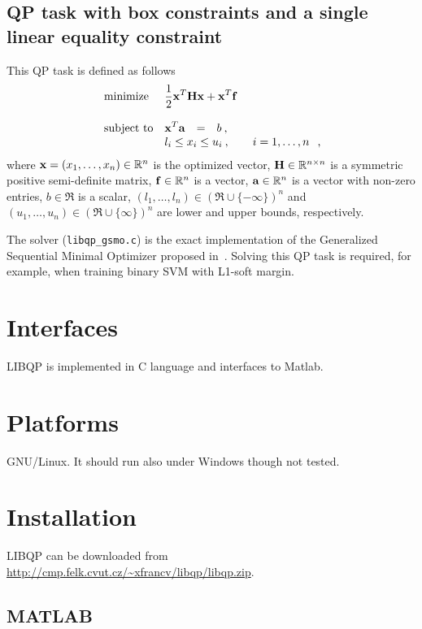 \documentclass{amsart}
\begin{document}
\subsection*{QP task with box constraints and a single linear equality constraint}
This QP task is defined as follows
\[
  \begin{array}{lrcl}
    \mbox{minimize} &\multicolumn{3}{l}{\displaystyle\frac{1}{2}\x^T \H \x +
      \x^T \f} \\ \\
    \mbox{subject to} 
    & \displaystyle\x^T \a & = & b\:, \\ 
    & \multicolumn{3}{c}{\displaystyle l_i \leq x_i \leq u_i\:, \qquad i=1,\ldots,n}\:,
  \end{array}
\]
where \(\mathbf x = (x_1,\ldots,x_n)\in\mathbb{R}^n\) is the optimized vector, \(\mathbf H
\in\mathbb{R}^{n\times n}\) is a symmetric positive semi-definite matrix,
\(\mathbf f\in\mathbb{R}^n\) is a vector, $\mathbf a\in\mathbb{R}^n$ is a vector with non-zero entries,
$b\in\Re$ is a scalar, $(l_1,\ldots,l_n)\in(\Re \cup \{-\infty\})^n$ and
$(u_1,\ldots,u_n)\in(\Re\cup\{\infty\})^n$ are lower and upper bounds,
respectively. 

The solver (\verb|libqp_gsmo.c|) is the exact implementation of the 
Generalized Sequential Minimal Optimizer proposed in~\cite{Keerthi-00}.
Solving this QP task is required, for example, when training binary 
SVM with L1-soft margin. 

\section*{Interfaces}

LIBQP is implemented in C language and interfaces to Matlab.

\section*{Platforms}

GNU/Linux. It should run also under Windows though not tested.

\section*{Installation}

LIBQP can be downloaded from \url{http://cmp.felk.cvut.cz/~xfrancv/libqp/libqp.zip}.

\subsection*{MATLAB}
\end{document}
